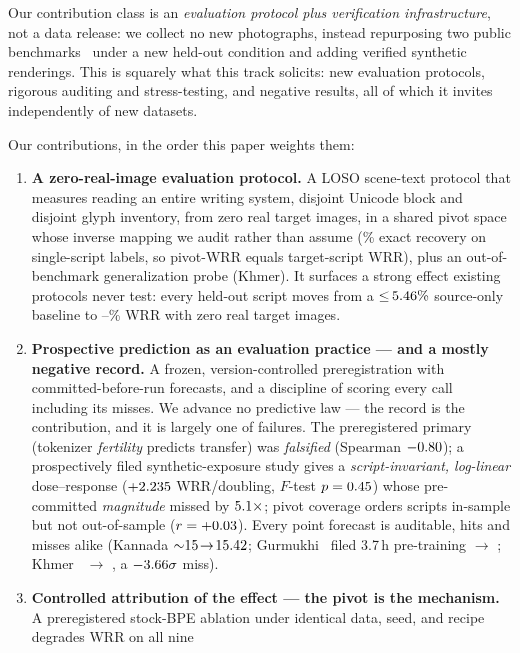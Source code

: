 Our contribution class is an \emph{evaluation protocol plus verification infrastructure}, not a
data release: we collect no new photographs, instead repurposing two public
benchmarks~\cite{bstd,khmerst} under a new held-out condition and adding verified synthetic
renderings. This is squarely what this track solicits: new evaluation protocols, rigorous
auditing and stress-testing, and negative results, all of which it invites independently of new
datasets.

\medskip\noindent Our contributions, in the order this paper weights them:
\begin{enumerate}
  \item \textbf{A zero-real-image evaluation protocol.} A LOSO scene-text protocol that measures
  reading an entire writing system, disjoint Unicode block and disjoint glyph inventory, from
  zero real target images, in a shared pivot space whose inverse mapping we audit rather than
  assume (\rtWordPure\% exact recovery on single-script labels, so pivot-WRR equals target-script
  WRR), plus an out-of-benchmark generalization probe (Khmer). It surfaces a
  strong effect existing protocols never test: every held-out script moves from a
  ${\le}\,5.46\%$ source-only baseline to \wrrBmin--\wrrBmax\% WRR with zero real target
  images.
  \item \textbf{Prospective prediction as an evaluation practice --- and a mostly negative
  record.} A frozen, version-controlled preregistration with committed-before-run forecasts, and a
  discipline of scoring every call including its misses. We advance no predictive law --- the record
  is the contribution, and it is largely one of failures. The preregistered primary (tokenizer
  \emph{fertility} predicts transfer) was \emph{falsified} (Spearman $-0.80$); a prospectively
  filed synthetic-exposure study gives a \emph{script-invariant, log-linear} dose--response
  ($+2.235$ WRR/doubling, $F$-test $p=0.45$) whose pre-committed \emph{magnitude} missed by
  $5.1\times$; pivot coverage orders scripts in-sample but not out-of-sample
  ($r=+0.03$). Every point forecast is auditable, hits and misses alike (Kannada
  ${\sim}15\!\to\!15.42$; Gurmukhi \predGurmukhi\ filed 3.7\,h pre-training $\to$
  \realGurmukhi; Khmer \khmerPred\ $\to$ \khmerB, a $-3.66\sigma$ miss).
  \item \textbf{Controlled attribution of the effect --- the pivot is the mechanism.} A
  preregistered stock-BPE ablation under identical data, seed, and recipe degrades WRR on all nine

\end{enumerate}
